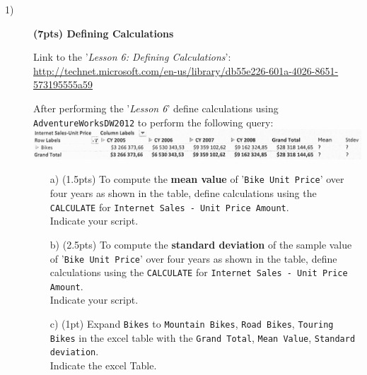 
\maketitle \thispagestyle{empty}
\flushleft

\begin{description}
\item[1)]{ \textbf{ (7pts) Defining Calculations}\par}
Link to the '\textit{Lesson 6: Defining Calculations}':\\
\url{http://technet.microsoft.com/en-us/library/db55e226-601a-4026-8651-573195555a59}
\par
After performing the '\textit{Lesson 6}' define calculations using \texttt{AdventureWorksDW2012} to perform the following query:\\
\vs
\includegraphics[scale=0.15]{img/question-1.png}

\begin{itemize}
\item[a) (1.5pts)] To compute the \textbf{mean value} of '\texttt{Bike Unit Price}' over four years as shown in the table, define calculations using the \texttt{CALCULATE} for \texttt{Internet Sales - Unit Price Amount}.\\
Indicate your script.\\
\answer

\vs \item[b) (2.5pts)] To compute the \textbf{standard deviation} of the sample value of '\texttt{Bike Unit Price}' over four years as shown in the table, define calculations using the \texttt{CALCULATE} for \texttt{Internet Sales - Unit Price Amount}.\\
Indicate your script.\\

\answer

\vs\item[c) (1pt)] Expand \texttt{Bikes} to \texttt{Mountain Bikes}, \texttt{Road Bikes}, \texttt{Touring Bikes} in the excel table with the \texttt{Grand Total}, \texttt{Mean Value}, \texttt{Standard deviation}.\\
Indicate the excel Table.\\


\end{itemize}
\end{description}
